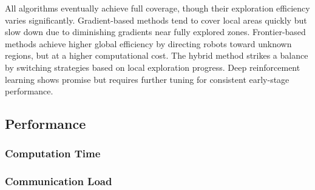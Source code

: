 All algorithms eventually achieve full coverage, though their exploration efficiency varies significantly. 
Gradient-based methods tend to cover local areas quickly but slow down due to diminishing gradients near fully explored zones. 
Frontier-based methods achieve higher global efficiency by directing robots toward unknown regions, but at a higher computational cost. The hybrid method strikes a balance by switching strategies based on local exploration progress. 
Deep reinforcement learning shows promise but requires further tuning for consistent early-stage performance.

\subsection{Performance}
\subsubsection{Computation Time}

\subsubsection{Communication {\color{red}Load}}
